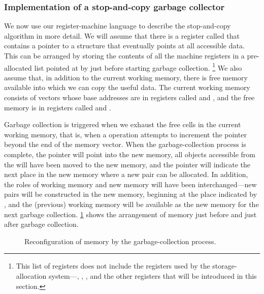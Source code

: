 \subsubsection*{Implementation of a stop-and-copy garbage collector}

We now use our register-machine language to describe the stop-and-copy algorithm in more detail.
We will assume that there is a register called  that contains a pointer to a structure that eventually points at all accessible data.
This can be arranged by storing the contents of all the machine registers in a pre-allocated list pointed at by  just before starting garbage collection.%
\footnote{
	This list of registers does not include the registers used by the storage-allocation system---, , , and the other registers that will be introduced in this section.
}
	We also assume that, in addition to the current working memory, there is free memory available into which we can copy the useful data.
	The current working memory consists of vectors whose base addresses are in registers called  and , and the free memory is in registers called  and .

Garbage collection is triggered when we exhaust the free cells in the current working memory, that is, when a  operation attempts to increment the  pointer beyond the end of the memory vector.
When the garbage-collection process is complete, the  pointer will point into the new memory, all objects accessible from the  will have been moved to the new memory, and the  pointer will indicate the next place in the new memory where a new pair can be allocated.
In addition, the roles of working memory and new memory will have been interchanged---new pairs will be constructed in the new memory, beginning at the place indicated by , and the (previous) working memory will be available as the new memory for the next garbage collection.
\cref{Figure 5.15} shows the arrangement of memory just before and just after garbage collection.

\begin{figure}[tp]
	\centering
	
	\caption{
		Reconfiguration of memory by the garbage-collection process.
	}
	\label{Figure 5.15}
\end{figure}

